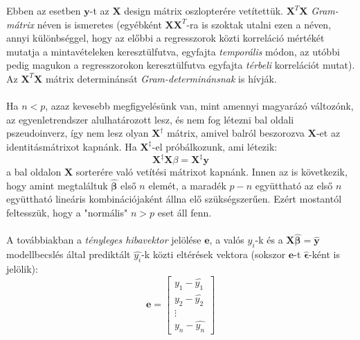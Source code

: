 \documentclass[14p]{report}
\def\pmb{\boldsymbol}
\def\ebeta{\hat{\pmb{\beta}}}
\def\e{\epsilon}
\newcounter{x}
\newcounter{y}
\newcounter{z}
\begin{document}
	\begin{center}
	\end{center}
	Ebben az esetben $\pmb{y}$-t az $\pmb{X}$ design mátrix oszlopterére vetítettük. $\pmb{X}^T\pmb{X}$ \emph{Gram-mátrix} néven is ismeretes (egyébként $\pmb{X}\pmb{X}^T$-ra is szoktak utalni ezen a néven, annyi különbséggel, hogy az előbbi a regresszorok közti korreláció mértékét mutatja a mintavételeken keresztülfutva, egyfajta \emph{temporális} módon, az utóbbi pedig magukon a regresszorokon keresztülfutva egyfajta \emph{térbeli} korrelációt mutat). Az $\pmb{X}^T\pmb{X}$ mátrix determinánsát \emph{Gram-determinánsnak} is hívják.
	\\
	\\
	Ha $n < p$, azaz kevesebb megfigyelésünk van, mint amennyi magyarázó változónk, az egyenletrendszer alulhatározott lesz, és nem fog létezni bal oldali pszeudoinverz, így nem lesz olyan $\pmb{X}^{\dagger}$ mátrix, amivel balról beszorozva $\pmb{X}$-et az identitásmátrixot kapnánk. Ha $\pmb{X}^{\ddagger}$-el próbálkozunk, ami létezik:
	\[
		\pmb{X}^{\ddagger}\pmb{X}\beta = \pmb{X}^{\ddagger}\pmb{y}
	\] 
	a bal oldalon $\pmb{X}$ sorterére való vetítési mátrixot kapnánk. Innen az is következik, hogy amint megtaláltuk $\ebeta$ első $n$ elemét, a maradék $p-n$ együttható az első $n$ együttható lineáris kombinációjaként állna elő szükségszerűen. Ezért mostantól feltesszük, hogy a "normális" $n > p$ eset áll fenn. 
	\\
	\\
	A továbbiakban a \emph{tényleges hibavektor} jelölése 
	$\pmb{e}$, a valós $y_i$-k és a $\pmb{X}\ebeta = \hat{\pmb{y}}$ modellbecslés által prediktált $\hat{y_i}$-k közti eltérések vektora (sokszor $\pmb{e}$-t $\widehat{\pmb{\e}}$-ként is jelölik):
	\[
	\pmb{e} =
	\begin{bmatrix}
		y_1 - \hat{y_1} \\
		y_2  - \hat{y_2} \\
		\vdots \\
		y_n - \hat{y_n}
	\end{bmatrix}
	\]
\end{document}
